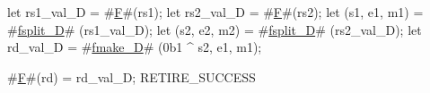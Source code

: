 let rs1_val_D    = #\hyperref[sailRISCVzF]{F}#(rs1);
let rs2_val_D    = #\hyperref[sailRISCVzF]{F}#(rs2);
let (s1, e1, m1) = #\hyperref[sailRISCVzfsplitzyD]{fsplit\_D}# (rs1_val_D);
let (s2, e2, m2) = #\hyperref[sailRISCVzfsplitzyD]{fsplit\_D}# (rs2_val_D);
let rd_val_D     = #\hyperref[sailRISCVzfmakezyD]{fmake\_D}# (0b1 ^ s2, e1, m1);

#\hyperref[sailRISCVzF]{F}#(rd) = rd_val_D;
RETIRE_SUCCESS
